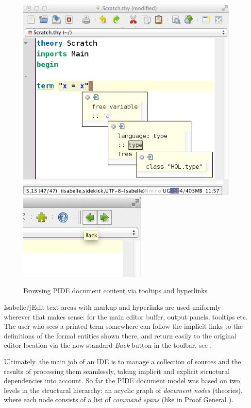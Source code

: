\begin{isabellebody}
\begin{isamarkuptext}
\begin{figure}[htb]
\begin{center}
\includegraphics[scale=0.333,valign=t]{popup2}
\includegraphics[scale=0.333,valign=t]{back}
\end{center}
\caption{Browsing PIDE document content via tooltips and hyperlinks}
\label{fig:navigation}
\end{figure}

\medskip Isabelle/jEdit text areas with markup and hyperlinks are used
uniformly wherever that makes sense: for the main editor buffer, output
panels, tooltips etc. The user who sees a printed term somewhere can follow
the implicit links to the definitions of the formal entities shown there,
and return easily to the original editor location via the now standard
\emph{Back} button in the toolbar, see .%
\end{isamarkuptext}%
\isamarkuptrue%
%
\isamarkuptrue%
%
\begin{isamarkuptext}%
Ultimately, the main job of an IDE is to manage a collection of
sources and the results of processing them seamlessly, taking implicit and
explicit structural dependencies into account. So far the PIDE document
model was based on two levels in the structural hierarchy: an acyclic graph
of \emph{document nodes} (theories), where each node consists of a list of
\emph{command spans} (like in Proof General \cite{Aspinall:TACAS:2000}).


\end{isamarkuptext}
\end{isabellebody}
